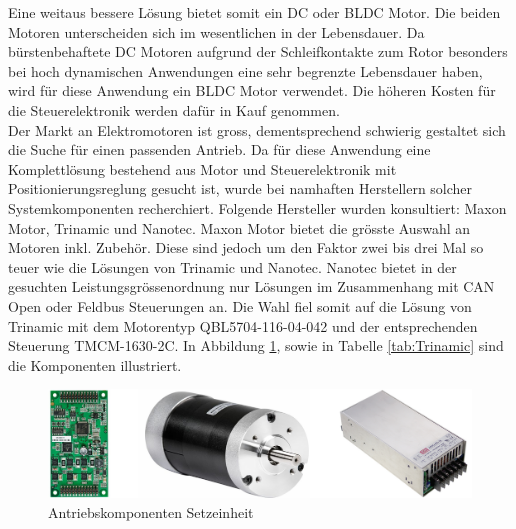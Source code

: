 Eine weitaus bessere Lösung bietet somit ein DC oder BLDC Motor. Die beiden Motoren unterscheiden sich im wesentlichen in der Lebensdauer. Da bürstenbehaftete DC Motoren aufgrund der Schleifkontakte zum Rotor besonders bei hoch dynamischen Anwendungen eine sehr begrenzte Lebensdauer haben, wird für diese Anwendung ein BLDC Motor verwendet. Die höheren Kosten für die Steuerelektronik werden dafür in Kauf genommen.\\
Der Markt an Elektromotoren ist gross, dementsprechend schwierig gestaltet sich die Suche für einen passenden Antrieb. Da für diese Anwendung eine Komplettlösung bestehend aus Motor und Steuerelektronik mit Positionierungsreglung gesucht ist, wurde bei namhaften Herstellern solcher Systemkomponenten recherchiert. Folgende Hersteller wurden konsultiert: Maxon Motor, Trinamic und Nanotec. Maxon Motor bietet die grösste Auswahl an Motoren inkl. Zubehör. Diese sind jedoch um den Faktor zwei bis drei Mal so teuer wie die Lösungen von Trinamic und Nanotec. Nanotec bietet in der gesuchten Leistungsgrössenordnung nur Lösungen im Zusammenhang mit CAN Open oder Feldbus Steuerungen an. Die Wahl fiel somit auf die Lösung von Trinamic mit dem Motorentyp QBL5704-116-04-042 und der entsprechenden Steuerung TMCM-1630-2C. In Abbildung \ref{fig:Trinamic}, sowie in Tabelle \ref{tab:Trinamic} sind die Komponenten illustriert.


\begin{figure}[H]
	\includegraphics[width=1\textwidth]{Illustrationen/5-Konzept/Trinamic.png}
	\caption{Antriebskomponenten Setzeinheit \protect\cite{Trinamic} \protect\cite{36V_Netzteil}}
	\label{fig:Trinamic}
\end{figure}

